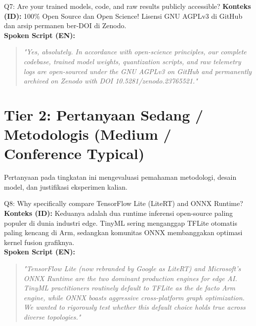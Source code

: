 \documentclass[11pt,a4paper]{article}
\begin{document}
\begin{easybox}{Q7: Are your trained models, code, and raw results publicly accessible?}
\textbf{Konteks (ID):} 100\% Open Source dan Open Science! Lisensi GNU AGPLv3 di GitHub dan arsip permanen ber-DOI di Zenodo.\\
\textbf{Spoken Script (EN):}
\begin{quote}
\small
\textit{"Yes, absolutely. In accordance with open-science principles, our complete codebase, trained model weights, quantization scripts, and raw telemetry logs are open-sourced under the GNU AGPLv3 on GitHub and permanently archived on Zenodo with DOI 10.5281/zenodo.23765521."}
\end{quote}
\end{easybox}

\newpage
\section*{\textcolor{TierOrangeBorder}{\Large Tier 2: Pertanyaan Sedang / Metodologis (Medium / Conference Typical)}}
Pertanyaan pada tingkatan ini mengevaluasi pemahaman metodologi, desain model, dan justifikasi eksperimen kalian.

\begin{mediumbox}{Q8: Why specifically compare TensorFlow Lite (LiteRT) and ONNX Runtime?}
\textbf{Konteks (ID):} Keduanya adalah dua runtime inferensi open-source paling populer di dunia industri edge. TinyML sering menganggap TFLite otomatis paling kencang di Arm, sedangkan komunitas ONNX membanggakan optimasi kernel fusion grafiknya.\\
\textbf{Spoken Script (EN):}
\begin{quote}
\small
\textit{"TensorFlow Lite (now rebranded by Google as LiteRT) and Microsoft's ONNX Runtime are the two dominant production engines for edge AI. TinyML practitioners routinely default to TFLite as the de facto Arm engine, while ONNX boasts aggressive cross-platform graph optimization. We wanted to rigorously test whether this default choice holds true across diverse topologies."}
\end{quote}
\end{mediumbox}
\end{document}
